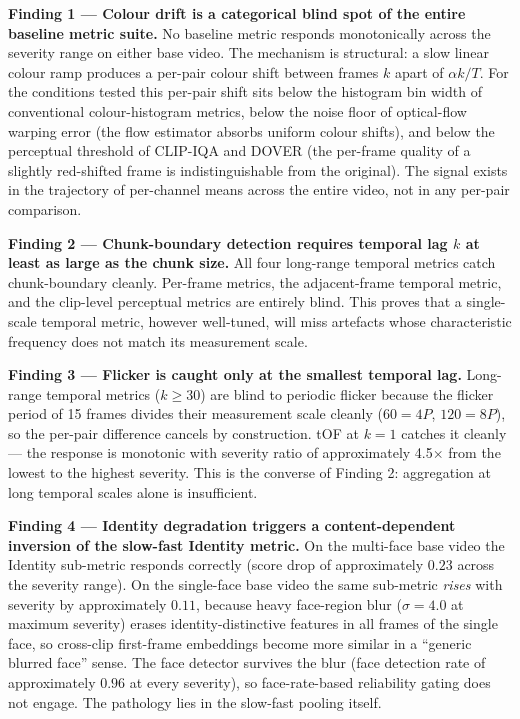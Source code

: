 \textbf{Finding 1 --- Colour drift is a categorical blind spot of the entire baseline metric
suite.} No baseline metric responds monotonically across the severity range on either base
video. The mechanism is structural: a slow linear colour ramp produces a per-pair colour
shift between frames $k$ apart of $\alpha k / T$. For the conditions tested this per-pair
shift sits below the histogram bin width of conventional colour-histogram metrics, below
the noise floor of optical-flow warping error (the flow estimator absorbs uniform colour
shifts), and below the perceptual threshold of CLIP-IQA and DOVER (the per-frame quality
of a slightly red-shifted frame is indistinguishable from the original). The signal exists
in the trajectory of per-channel means across the entire video, not in any per-pair
comparison.

\textbf{Finding 2 --- Chunk-boundary detection requires temporal lag $k$ at least as large
as the chunk size.} All four long-range temporal metrics catch chunk-boundary cleanly.
Per-frame metrics, the adjacent-frame temporal metric, and the clip-level perceptual
metrics are entirely blind. This proves that a single-scale temporal metric, however
well-tuned, will miss artefacts whose characteristic frequency does not match its
measurement scale.

\textbf{Finding 3 --- Flicker is caught only at the smallest temporal lag.} Long-range
temporal metrics ($k \geq 30$) are blind to periodic flicker because the flicker period of
15 frames divides their measurement scale cleanly ($60 = 4P$, $120 = 8P$), so the per-pair
difference cancels by construction. tOF at $k=1$ catches it cleanly --- the response is
monotonic with severity ratio of approximately 4.5$\times$ from the lowest to the highest
severity. This is the converse of Finding 2: aggregation at long temporal scales alone is
insufficient.

\textbf{Finding 4 --- Identity degradation triggers a content-dependent inversion of the
slow-fast Identity metric.} On the multi-face base video the Identity sub-metric responds
correctly (score drop of approximately $0.23$ across the severity range). On the single-face
base video the same sub-metric \emph{rises} with severity by approximately $0.11$, because
heavy face-region blur ($\sigma = 4.0$ at maximum severity) erases identity-distinctive
features in all frames of the single face, so cross-clip first-frame embeddings become more
similar in a ``generic blurred face'' sense. The face detector survives the blur (face
detection rate of approximately $0.96$ at every severity), so face-rate-based reliability
gating does not engage. The pathology lies in the slow-fast pooling itself.

